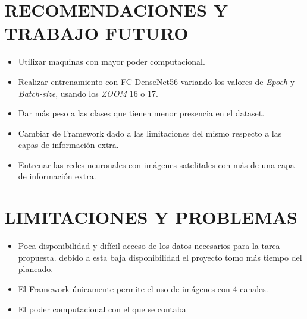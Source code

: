 
\newpage\chapter{RECOMENDACIONES Y TRABAJO FUTURO}
	
	\begin{itemize}
	
	\item Utilizar maquinas con mayor poder computacional. 

    \item Realizar entrenamiento con FC-DenseNet56 variando los valores de \textit{Epoch} y \textit{Batch-size}, usando los \textit{ZOOM} 16 o 17. 

    \item Dar más peso a las clases que tienen menor presencia en el dataset. 

    \item Cambiar de Framework dado a las limitaciones del mismo respecto a las capas de información extra. 

    \item Entrenar las redes neuronales con imágenes satelitales con más de una capa de información extra. 
	
	
	\end{itemize}
  


    
\newpage\chapter{LIMITACIONES Y PROBLEMAS} 

	\begin{itemize}
		\item{Poca disponibilidad y difícil acceso de los datos necesarios para la tarea propuesta. debido a esta baja disponibilidad el proyecto tomo más tiempo del planeado.} 

        \item{El Framework únicamente permite el uso de imágenes con 4 canales.} 

        \item{El poder computacional con el que se contaba} 	
	
	\end{itemize}
        
